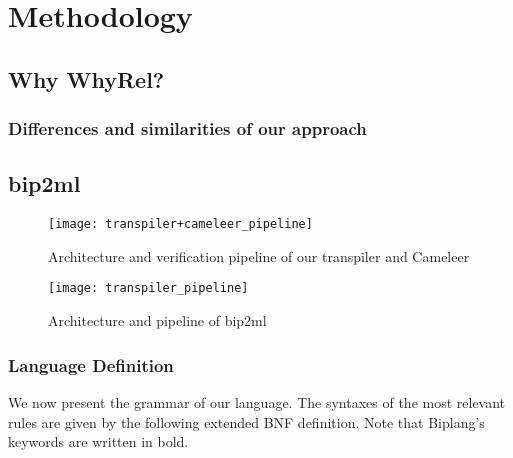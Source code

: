 
%

\chapter{Methodology}
\label{cha:methodology}


\FloatBarrier
\section{Why WhyRel?}
\label{sec:whyrel_why}



\subsection{Differences and similarities of our approach}
\label{subsec:whyrel_diff_simil}





\FloatBarrier
\section{bip2ml}
\label{sec:bip2ml}

\begin{figure}[htbp]
  \centering
  \texttt{[image: transpiler+cameleer\_pipeline]}
  \caption{Architecture and verification pipeline of our transpiler and Cameleer}
  \label{fig:transpiler_cameleer_pipeline}
\end{figure}

\begin{figure}[htbp]
  \centering
  \texttt{[image: transpiler\_pipeline]}
  \caption{Architecture and pipeline of bip2ml}
  \label{fig:transpiler_pipeline}
\end{figure}


\FloatBarrier
\subsection{Language Definition}
\label{subsec:lang_def}

We now present the grammar of our language.
The syntaxes of the most relevant rules are given by the following extended BNF definition.
Note that Biplang's keywords are written in bold.

